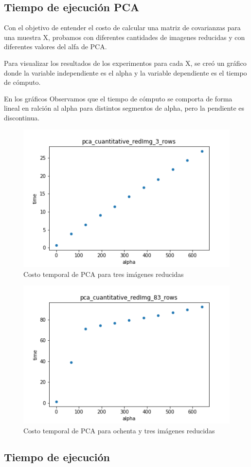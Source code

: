 \subsection{Tiempo de ejecución PCA}

Con el objetivo de entender el costo de calcular una matriz de covarianzas para una muestra X, probamos con diferentes cantidades de imagenes reducidas y con diferentes valores del alfa de PCA. 

Para visualizar los resultados de los experimentos para cada X, se creó un gráfico donde la variable independiente es el alpha y la variable dependiente es el tiempo de cómputo. 

En los gráficos Observamos que el tiempo de cómputo se comporta de forma lineal en ralción al alpha para distintos segmentos de alpha, pero la pendiente es discontinua.

\begin{figure}[H]
	\begin{center}
      \includegraphics[width=0.4\columnwidth]{imagenes/charuli-des/pca_cuantitative_redImg_3_rows.png}
      \caption{Costo temporal de PCA para tres imágenes reducidas}
      \end{center}
\end{figure}
\begin{figure}
	\begin{center}
    	\includegraphics[width=0.4\columnwidth]{imagenes/charuli-des/pca_cuantitative_redImg_83_rows.png}
     \caption{Costo temporal de PCA para ochenta y tres imágenes reducidas}
     \end{center}
\end{figure}

\subsection{Tiempo de ejecución}

